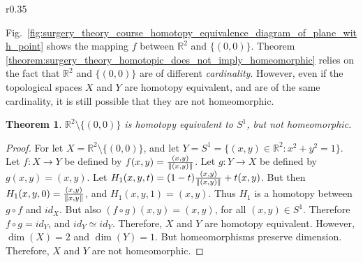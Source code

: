 \documentclass{article}
\theoremstyle{mystyle}
\newtheorem{theorem}{Theorem}[section]
\DeclarePairedDelimiter\norm{\lVert}{\rVert}
\begin{document}
\begin{wrapfigure}[6]{r}{0.35\textwidth}
    \centering
    \vspace{-5ex}
    \vspace{-1ex}
    \caption{Retraction of $\mathbb{R}^{2}$ to $(0,0)$}
    \label{fig:surgery_theory_course_homotopy_equivalence_diagram_of_plane_with_point}
\end{wrapfigure}
Fig.~\ref{fig:surgery_theory_course_homotopy_equivalence_diagram_of_plane_with_point} shows the mapping $f$ between $\mathbb{R}^{2}$ and $\{(0,0)\}$. Theorem \ref{theorem:surgery_theory_homotopic_does_not_imply_homeomorphic} relies on the fact that $\mathbb{R}^2$ and $\{(0,0)\}$ are of different \textit{cardinality}. However, even if the topological spaces $X$ and $Y$ are homotopy equivalent, and are of the same cardinality, it is still possible that they are not homeomorphic.
\begin{theorem}
\label{theorem:surgery_theory_Homotopy_equivalance_of_plane_without_point_and_unit_disc_but_not_homeomorphic}
$\mathbb{R}^{2}\setminus\{(0,0)\}$ is homotopy equivalent to $S^{1}$, but not homeomorphic.
\end{theorem}
\begin{proof}
For let $X = \mathbb{R}^{2}\setminus\{(0,0)\}$, and let $Y = S^{1} = \{(x,y)\in \mathbb{R}^{2}:x^2+y^2=1\}$. Let $f:X\rightarrow Y$ be defined by $f(x,y) = \frac{(x,y)}{\norm{(x,y)}}$. Let $g:Y\rightarrow X$ be defined by $g(x,y) = (x,y)$. Let $H_1(x,y,t) = (1-t)\frac{(x,y)}{\norm{(x,y)}}+t(x,y)$. But then $H_1(x,y,0) = \frac{(x,y)}{\norm{x,y}}$, and $H_1(x,y,1) = (x,y)$. Thus $H_1$ is a homotopy between $g\circ f$ and $id_{X}$. But also $(f\circ g)(x,y) = (x,y)$, for all $(x,y)\in S^{1}$. Therefore $f\circ g= id_{Y}$, and $id_{Y}\simeq id_{Y}$. Therefore, $X$ and $Y$ are homotopy equivalent. However, $\dim(X) = 2$ and $\dim(Y) = 1$. But homeomorphisms preserve dimension. Therefore, $X$ and $Y$ are not homeomorphic.
\end{proof}
\end{document}

